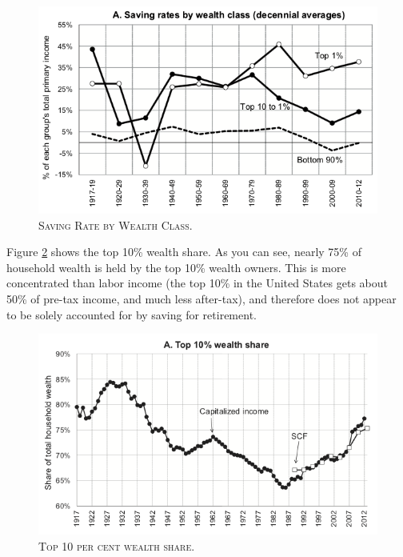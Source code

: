 \documentclass[]{book}
\theoremstyle{definition}
\theoremstyle{definition}
\theoremstyle{definition}
\theoremstyle{remark}
\begin{document}
\begin{figure}

{\centering \includegraphics[width=1\linewidth,height=1\textheight]{figures/fig9a} 

}

\caption{\textsc{Saving Rate by Wealth Class}.}\label{fig:saez-zucman-fig9a}
\end{figure}

Figure \ref{fig:saez-zucman-fig6a} shows the top 10\% wealth share. As
you can see, nearly 75\% of household wealth is held by the top 10\%
wealth owners. This is more concentrated than labor income (the top 10\%
in the United States gets about 50\% of pre-tax income, and much less
after-tax), and therefore does not appear to be solely accounted for by
saving for retirement.



\begin{figure}

{\centering \includegraphics[width=1\linewidth,height=1\textheight]{figures/fig6a} 

}

\caption{\textsc{Top 10 per cent wealth share}.}\label{fig:saez-zucman-fig6a}
\end{figure}
\end{document}
